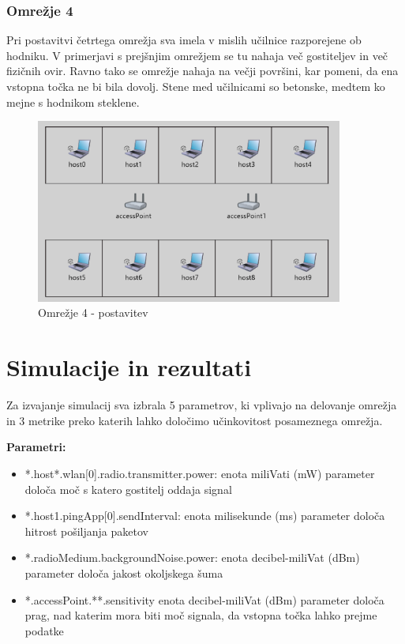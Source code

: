 \documentclass[11pt,a4paper,slovene]{myarticle}
\begin{document}
\pagebreak

\subsubsection{Omrežje 4}
Pri postavitvi četrtega omrežja sva imela v mislih učilnice razporejene ob hodniku. V primerjavi s prejšnjim omrežjem se tu nahaja več gostiteljev in več fizičnih ovir. Ravno tako se omrežje nahaja na večji površini, kar pomeni, da ena vstopna točka ne bi bila dovolj. Stene med učilnicami so betonske, medtem ko mejne s hodnikom steklene.
\begin{figure}[h!]
	\centering
		\includegraphics[width=0.9\textwidth, keepaspectratio=true]{./images/om4-layout.png}
	\caption{Omrežje 4 - postavitev}
	\label{fig:om4layout}
\end{figure}

\section{Simulacije in rezultati}
Za izvajanje simulacij sva izbrala 5 parametrov, ki vplivajo na delovanje omrežja in 3 metrike preko katerih lahko določimo učinkovitost posameznega omrežja.

\textbf{Parametri:}
\begin{itemize}
	\item *.host*.wlan[0].radio.transmitter.power:
		\subitem enota miliVati (mW)
		\subitem parameter določa moč s katero gostitelj oddaja signal
	\item *.host1.pingApp[0].sendInterval:
		\subitem enota milisekunde (ms)
		\subitem parameter določa hitrost pošiljanja paketov
	\item *.radioMedium.backgroundNoise.power:
		\subitem enota decibel-miliVat (dBm)
		\subitem parameter določa jakost okoljskega šuma
	\item *.accessPoint.**.sensitivity
		\subitem enota decibel-miliVat (dBm)
		\subitem parameter določa prag, nad katerim mora biti moč signala, da vstopna točka lahko prejme podatke
\end{itemize}
\end{document}
